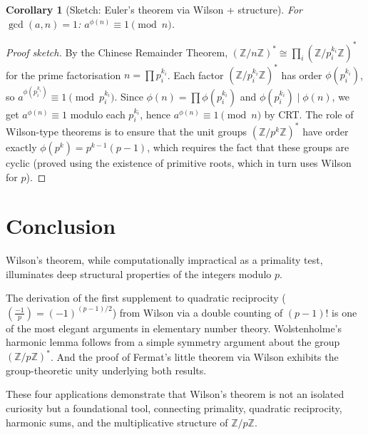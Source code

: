 \documentclass[12pt,a4paper]{amsart}
\newtheorem{corollary}[theorem]{Corollary}
\theoremstyle{definition}
\newcommand{\Z}{\mathbb{Z}}
\newcommand{\leg}[2]{\left(\frac{#1}{#2}\right)}
\begin{document}
\begin{corollary}[Sketch: Euler's theorem via Wilson + structure]\label{cor:euler}
  For $\gcd(a, n) = 1$: $a^{\phi(n)} \equiv 1 \pmod n$.
\end{corollary}

\begin{proof}[Proof sketch]
  By the Chinese Remainder Theorem, $(\Z/n\Z)^* \cong \prod_i (\Z/p_i^{k_i}\Z)^*$
  for the prime factorisation $n = \prod p_i^{k_i}$.
  Each factor $(\Z/p_i^{k_i}\Z)^*$ has order $\phi(p_i^{k_i})$, so
  $a^{\phi(p_i^{k_i})} \equiv 1 \pmod{p_i^{k_i}}$.
  Since $\phi(n) = \prod \phi(p_i^{k_i})$ and $\phi(p_i^{k_i}) \mid \phi(n)$,
  we get $a^{\phi(n)} \equiv 1$ modulo each $p_i^{k_i}$, hence
  $a^{\phi(n)} \equiv 1 \pmod n$ by CRT.
  The role of Wilson-type theorems is to ensure that the unit groups
  $(\Z/p^k\Z)^*$ have order exactly $\phi(p^k) = p^{k-1}(p-1)$, which
  requires the fact that these groups are cyclic (proved using the existence
  of primitive roots, which in turn uses Wilson for $p$).
\end{proof}

\section{Conclusion}

Wilson's theorem, while computationally impractical as a primality test,
illuminates deep structural properties of the integers modulo $p$.

The derivation of the first supplement to quadratic reciprocity
($\leg{-1}{p} = (-1)^{(p-1)/2}$) from Wilson via a double counting of $(p-1)!$
is one of the most elegant arguments in elementary number theory.
Wolstenholme's harmonic lemma follows from a simple symmetry argument about
the group $(\Z/p\Z)^*$.  And the proof of Fermat's little theorem via Wilson
exhibits the group-theoretic unity underlying both results.

These four applications demonstrate that Wilson's theorem is not an isolated
curiosity but a foundational tool, connecting primality, quadratic reciprocity,
harmonic sums, and the multiplicative structure of $\Z/p\Z$.
\end{document}
